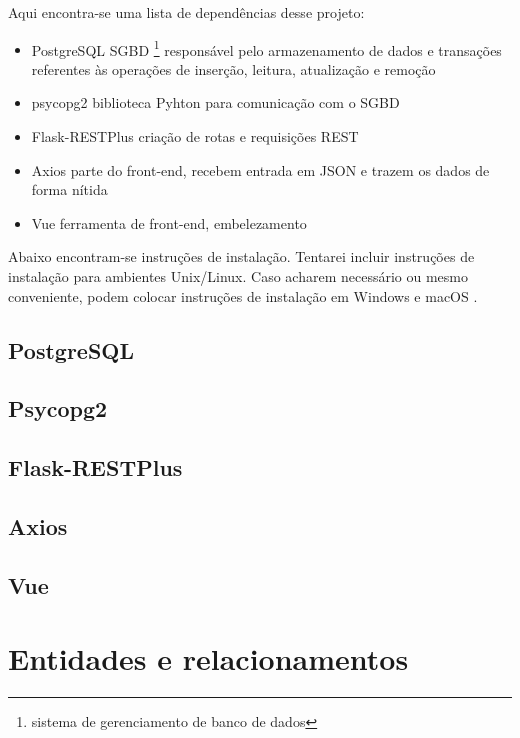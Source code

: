 \documentclass[11pt]{article}
\begin{document}
    Aqui encontra-se uma lista de dependências desse projeto:
    \begin{itemize}
        \item PostgreSQL \dir SGBD \footnote{sistema de gerenciamento de banco de dados}
        responsável pelo armazenamento de dados e transações referentes às operações de
        inserção, leitura, atualização e remoção
        \item psycopg2 \dir biblioteca Pyhton para comunicação com o SGBD
        \item Flask-RESTPlus \dir criação de rotas e requisições REST
        \item Axios \dir parte do front-end, recebem entrada em JSON e trazem os dados de
        forma nítida
        \item Vue \dir ferramenta de front-end, embelezamento
    \end{itemize}
    Abaixo encontram-se instruções de instalação. Tentarei incluir instruções de instalação
    para ambientes Unix/Linux. Caso acharem necessário ou mesmo conveniente, podem colocar
    instruções de instalação em Windows e macOS .

        \subsection{PostgreSQL}
        \subsection{Psycopg2}
        \subsection{Flask-RESTPlus}
        \subsection{Axios}
        \subsection{Vue}

    \section[Descrição]{Entidades e relacionamentos}
\end{document}
